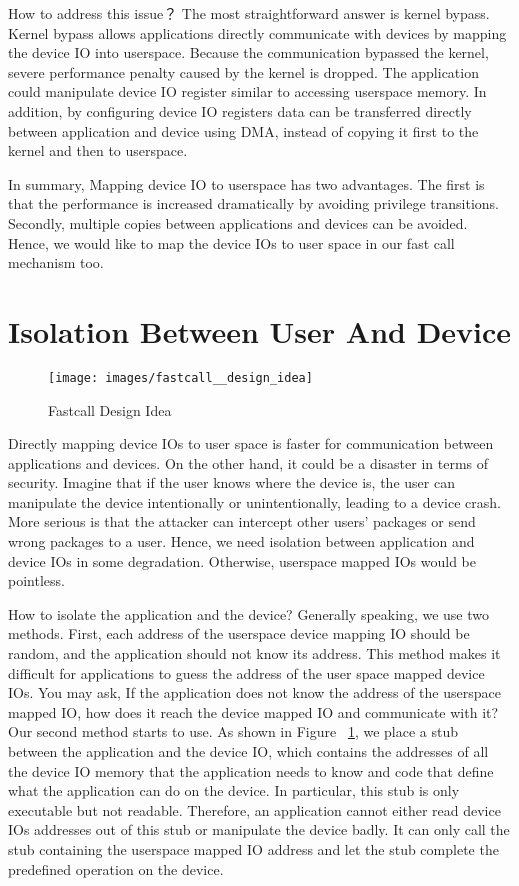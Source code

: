 How to address this issue？ The most straightforward answer is kernel bypass. Kernel bypass allows applications directly communicate with devices by mapping the device IO into userspace. Because the communication bypassed the kernel, severe performance penalty caused by the kernel is dropped. The application could manipulate device IO register similar to accessing userspace memory. In addition, by configuring device IO registers data can be transferred directly between application and device using DMA, instead of copying it first to the kernel and then to userspace.

In summary, Mapping device IO to userspace has two advantages. The first is that the performance is increased dramatically by avoiding privilege transitions. Secondly, multiple copies between applications and devices can be avoided. Hence, we would like to map the device IOs to user space in our fast call mechanism too.

\section{Isolation Between User And Device}

\begin{figure}[tbp]
  \centering
  \texttt{[image: images/fastcall\_\_design\_idea]}
  \caption[Short description]{Fastcall Design Idea}
  \label{fig:fastcall__design_idea}
\end{figure}


Directly mapping device IOs to user space is faster for communication between 
applications and devices. On the other hand, it could be a disaster in terms of 
security. Imagine that if the user knows where the device is, the user can manipulate 
the device intentionally or unintentionally, leading to a device crash. More serious is 
that the attacker can intercept other users' packages or send wrong packages to a user.  
Hence, we need isolation between application and device IOs in some degradation. Otherwise, 
userspace mapped IOs would be pointless. 


How to isolate the application and the device? Generally 
speaking, we use two methods. First, each address of the 
userspace device mapping IO should be random, and the application 
should not know its address. This method makes it difficult for applications 
to guess the address of the user space mapped device IOs. You may ask, If the
application does not know the address of the userspace mapped IO, how does it 
reach the device mapped IO and communicate with it? Our second method starts to use. 
As shown in Figure ~\ref{fig:fastcall__design_idea}, we place a stub between the application and the device IO, which contains the addresses of all the device IO memory that the application needs to know and code that define what the application can do on the device. In particular, this stub is only executable but not readable. Therefore, an application cannot either read device IOs addresses out of this stub or manipulate the device badly. It can only call the stub containing the userspace mapped IO address and let the stub complete the predefined operation on the device. 

